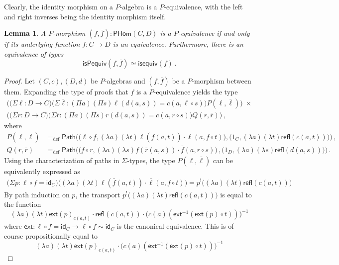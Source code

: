 \documentclass[10pt,a4paper,oneside,reqno]{amsart}
\numberwithin{equation}{section}
\theoremstyle{mythm}
\newtheorem{lemma}[theorem]{Lemma}
\theoremstyle{mydef}
\theoremstyle{myrmk}
\newcommand{\defeq}{=_{\mathrm{def}}}
\newcommand{\co}{\colon}
\newcommand{\idfun}[1]{\mathsf{id}_{#1}}
\newcommand{\comp}{\circ}
\newcommand{\ct}{\cdot}
\newcommand{\ext}{\mathsf{ext}}
\newcommand{\Id}{\mathsf{Path}}
\newcommand{\refl}{\mathsf{refl}}
\newcommand{\WHom}{\mathsf{PHom}}
\begin{document}
Clearly, the identity morphism on a $P$-algebra is a $P$-equivalence, with the left and right inverses being the identity morphism itself.

\begin{lemma}\label{WAlgSpace} A $P$-morphism $(f, \bar{f}) \co \WHom(C,D)$ is a $P$-equivalence if and only
if its underlying function $f \co C \to D$ is an equivalence. Furthermore, there is an equivalence of types
\[
\mathsf{isPequiv}(f, \bar{f})  \simeq \mathsf{isequiv}(f) \, . 
\]
\end{lemma}  
\begin{proof}
Let $(C,c), (D,d)$ be $P$-algebras and $(f, \bar{f})$ be a $P$-morphism between them. Expanding the type of proofs that $f$ is a $P$-equivalence yields the type
\begin{multline*}
 \Big(\big(\Sigma \ell \co D \to  C \big) \big(\Sigma \bar{\ell} : (\Pi a) (\Pi s) \ell(d(a,s))=c(a,\ell \circ s)\big)
P(\ell,\bar{\ell})\Big) \; \times \\ 
 \Big(\big(\Sigma r \co D \to C \big) \big(\Sigma \bar{r} : (\Pi a) (\Pi s) r(d(a,s))=c(a,r \circ s) \big) Q(r,\bar{r})  \Big)\, , 
\end{multline*}
where
\begin{align*}
P(\ell,\bar{\ell}) & \defeq \Id \Big( \big( \ell \comp f, (\lambda a)(\lambda t) \ell(\bar{f}(a,t)) \ct \bar{\ell}(a, f \comp t)\big), \big( 1_C, (\lambda a)(\lambda t) \refl(c(a,t))\big) \Big)  \, , \\
Q(r,\bar{r})    & \defeq \Id \Big( \big( f \comp r, (\lambda a)(\lambda s) f(\bar{r}(a,s)) \ct \bar{f}(a, r \comp s)\big) \, , \big( 1_D, (\lambda a)(\lambda s) \refl(d(a,s)) \big) \Big) \, .
\end{align*}
Using the characterization of paths in $\Sigma$-types, the type $P(\ell,\bar{\ell})$ can be equivalently expressed as
\begin{align*}
\big(\Sigma p : \ell \comp f = \idfun{C} \big) \Big((\lambda a) (\lambda t) \ell(\bar{f}(a,t)) \ct \bar{\ell}(a, f \comp t)\Big) = p^{!} \Big((\lambda a) (\lambda t) \refl(c(a,t))\Big) 
\end{align*}
By path induction on $p$, the transport $p^{!} \Big((\lambda a) (\lambda t) \refl(c(a,t))\Big)$ is equal to the function
\[ (\lambda a) (\lambda t) \ext(p)_{c(a,t)} \ct \refl(c(a,t)) \ct \big(c(a)(\ext^{-1}(\ext(p) \circ t))\big)^{-1} \]
where $\ext : \ell \comp f = \idfun{C} \to \ell \comp f \sim \idfun{C}$ is the canonical equivalence. This is of course propositionally equal to
\[ (\lambda a) (\lambda t) \ext(p)_{c(a,t)} \ct \big(c(a)(\ext^{-1}(\ext(p) \circ t))\big)^{-1} \]

\end{proof}
\end{document}
